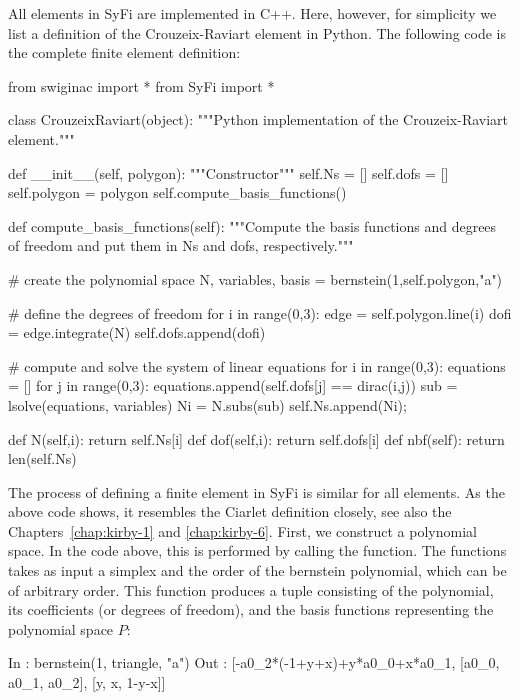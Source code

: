 All elements in SyFi are implemented in C++. Here, however, for simplicity we list a definition 
of the Crouzeix-Raviart element in Python.  The following code is the complete
finite element definition: 
\begin{python}
from swiginac import *
from SyFi import *

class CrouzeixRaviart(object): 
    """Python implementation of the Crouzeix-Raviart element.""" 

    def __init__(self, polygon):  
        """Constructor"""
        self.Ns = []
        self.dofs = []
        self.polygon = polygon 
        self.compute_basis_functions()

    def compute_basis_functions(self): 
        """Compute the basis functions and degrees of freedom  
        and put them in Ns and dofs, respectively."""

        # create the polynomial space
        N, variables, basis = bernstein(1,self.polygon,"a")

        # define the degrees of freedom 
        for i in range(0,3): 
            edge = self.polygon.line(i)
            dofi = edge.integrate(N) 
            self.dofs.append(dofi)

        # compute and solve the system of linear equations
        for i in range(0,3): 
            equations = []
                for j in range(0,3): 
                    equations.append(self.dofs[j] == dirac(i,j))
                    sub = lsolve(equations, variables) 
                    Ni = N.subs(sub) 
                    self.Ns.append(Ni); 

    def N(self,i): return self.Ns[i]
    def dof(self,i): return self.dofs[i]
    def nbf(self): return len(self.Ns)
\end{python}
The process of defining a finite element in SyFi is similar for all
elements.  As the above code shows,  it resembles the Ciarlet definition closely, see
also the Chapters~\ref{chap:kirby-1} and \ref{chap:kirby-6}. 
First, we construct a polynomial space. In the code above, this is performed by calling the 
function. The  functions takes as input a simplex and the order of the bernstein polynomial, 
which can be of arbitrary order. This function produces a tuple consisting of 
the polynomial, its coefficients (or degrees of freedom), and the basis functions
representing the polynomial space $P$: 
\begin{python}
In  : bernstein(1, triangle, "a")
Out : [-a0_2*(-1+y+x)+y*a0_0+x*a0_1, [a0_0, a0_1, a0_2], [y, x, 1-y-x]]
\end{python}
